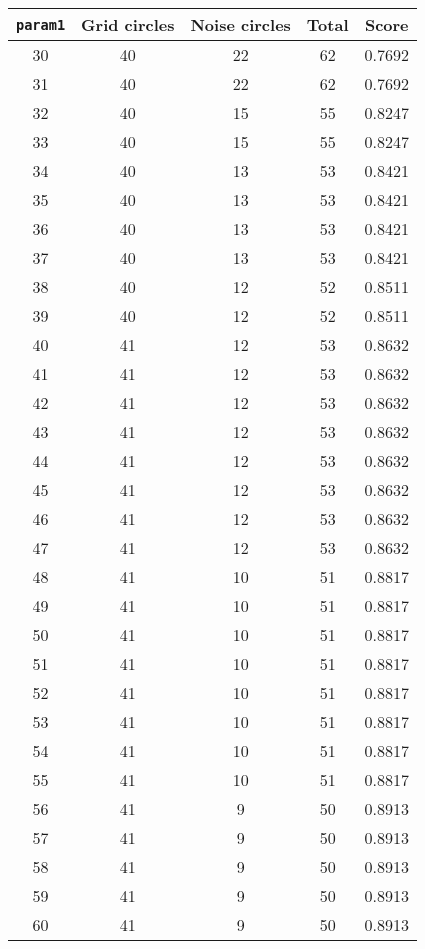 \documentclass[letterpaper, 12pt]{article}
\begin{document}
\begin{longtable}{|c|c|c|c|c|}
\hline
\textbf{\texttt{param1}} & \textbf{Grid circles} & \textbf{Noise circles} & \textbf{Total} & \textbf{Score} \\
\hline
30 & 40 & 22 & 62 & 0.7692 \\
\hline
31 & 40 & 22 & 62 & 0.7692 \\
\hline
32 & 40 & 15 & 55 & 0.8247 \\
\hline
33 & 40 & 15 & 55 & 0.8247 \\
\hline
34 & 40 & 13 & 53 & 0.8421 \\
\hline
35 & 40 & 13 & 53 & 0.8421 \\
\hline
36 & 40 & 13 & 53 & 0.8421 \\
\hline
37 & 40 & 13 & 53 & 0.8421 \\
\hline
38 & 40 & 12 & 52 & 0.8511 \\
\hline
39 & 40 & 12 & 52 & 0.8511 \\
\hline
40 & 41 & 12 & 53 & 0.8632 \\
\hline
41 & 41 & 12 & 53 & 0.8632 \\
\hline
42 & 41 & 12 & 53 & 0.8632 \\
\hline
43 & 41 & 12 & 53 & 0.8632 \\
\hline
44 & 41 & 12 & 53 & 0.8632 \\
\hline
45 & 41 & 12 & 53 & 0.8632 \\
\hline
46 & 41 & 12 & 53 & 0.8632 \\
\hline
47 & 41 & 12 & 53 & 0.8632 \\
\hline
48 & 41 & 10 & 51 & 0.8817 \\
\hline
49 & 41 & 10 & 51 & 0.8817 \\
\hline
50 & 41 & 10 & 51 & 0.8817 \\
\hline
51 & 41 & 10 & 51 & 0.8817 \\
\hline
52 & 41 & 10 & 51 & 0.8817 \\
\hline
53 & 41 & 10 & 51 & 0.8817 \\
\hline
54 & 41 & 10 & 51 & 0.8817 \\
\hline
55 & 41 & 10 & 51 & 0.8817 \\
\hline
56 & 41 & 9 & 50 & 0.8913 \\
\hline
57 & 41 & 9 & 50 & 0.8913 \\
\hline
58 & 41 & 9 & 50 & 0.8913 \\
\hline
59 & 41 & 9 & 50 & 0.8913 \\
\hline
60 & 41 & 9 & 50 & 0.8913 \\

\end{longtable}
\end{document}
